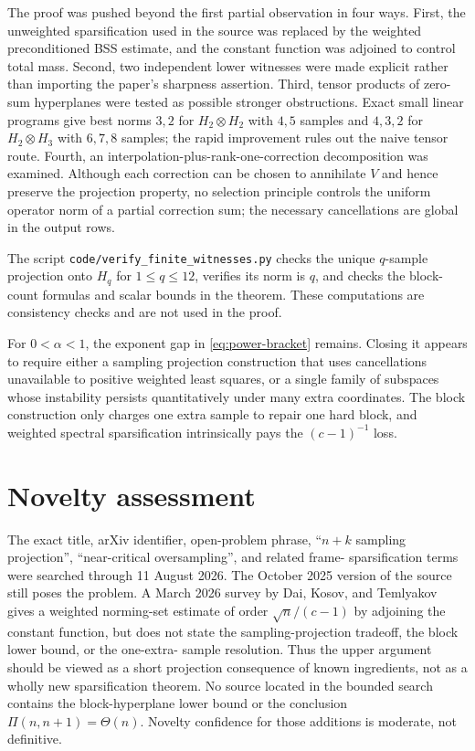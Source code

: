 \documentclass[11pt]{article}
\begin{document}
The proof was pushed beyond the first partial observation in four ways.
First, the unweighted sparsification used in the source was replaced by the
weighted preconditioned BSS estimate, and the constant function was adjoined
to control total mass.  Second, two independent lower witnesses were made
explicit rather than importing the paper's sharpness assertion.  Third,
tensor products of zero-sum hyperplanes were tested as possible stronger
obstructions.  Exact small linear programs give best norms $3,2$ for
$H_2\otimes H_2$ with $4,5$ samples and $4,3,2$ for
$H_2\otimes H_3$ with $6,7,8$ samples; the rapid improvement rules out the
naive tensor route.  Fourth, an interpolation-plus-rank-one-correction
decomposition was examined.  Although each correction can be chosen to
annihilate $V$ and hence preserve the projection property, no selection
principle controls the uniform operator norm of a partial correction sum;
the necessary cancellations are global in the output rows.

The script \texttt{code/verify\_finite\_witnesses.py} checks the unique
$q$-sample projection onto $H_q$ for $1\leq q\leq12$, verifies its norm is
$q$, and checks the block-count formulas and scalar bounds in the theorem.
These computations are consistency checks and are not used in the proof.

For $0<\alpha<1$, the exponent gap in \eqref{eq:power-bracket} remains.
Closing it appears to require either a sampling projection construction that
uses cancellations unavailable to positive weighted least squares, or a
single family of subspaces whose instability persists quantitatively under
many extra coordinates.  The block construction only charges one extra
sample to repair one hard block, and weighted spectral sparsification
intrinsically pays the $(c-1)^{-1}$ loss.

\section{Novelty assessment}

The exact title, arXiv identifier, open-problem phrase, ``$n+k$ sampling
projection'', ``near-critical oversampling'', and related frame-
sparsification terms were searched through 11 August 2026.  The October 2025
version of the source still poses the problem.  A March 2026 survey by Dai,
Kosov, and Temlyakov \cite{DKT} gives a weighted norming-set estimate of
order $\sqrt n/(c-1)$ by adjoining the constant function, but does not state
the sampling-projection tradeoff, the block lower bound, or the one-extra-
sample resolution.  Thus the upper argument should be viewed as a short
projection consequence of known ingredients, not as a wholly new
sparsification theorem.  No source located in the bounded search contains
the block-hyperplane lower bound or the conclusion
$\Pi(n,n+1)=\Theta(n)$.  Novelty confidence for those additions is moderate,
not definitive.
\end{document}
